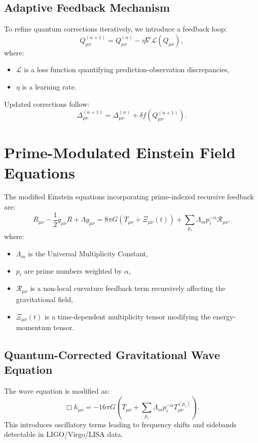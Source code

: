 \documentclass[12]{amsart}
\theoremstyle{plain}
\begin{document}
\subsection{Adaptive Feedback Mechanism}
To refine quantum corrections iteratively, we introduce a feedback loop:
\begin{equation}
    Q_{\mu\nu}^{(n+1)} = Q_{\mu\nu}^{(n)} - \eta \nabla \mathcal{L}(Q_{\mu\nu}),
\end{equation}
where:
\begin{itemize}
    \item \( \mathcal{L} \) is a loss function quantifying prediction-observation discrepancies,
    \item \( \eta \) is a learning rate.
\end{itemize}
Updated corrections follow:
\begin{equation}
    \Delta_{\mu\nu}^{(n+1)} = \Delta_{\mu\nu}^{(n)} + \delta f(Q_{\mu\nu}^{(n+1)}).
\end{equation}

\section{Prime-Modulated Einstein Field Equations}
The modified Einstein equations incorporating prime-indexed recursive feedback are:
\begin{equation}
    R_{\mu\nu} - \frac{1}{2} g_{\mu\nu} R + \Lambda g_{\mu\nu} = 8\pi G \left( T_{\mu\nu} + \Xi_{\mu\nu}(t) \right) + \sum_{p_i} \Lambda_m p_i^{-\alpha} \mathcal{R}_{\mu\nu}.
\end{equation}
where:
\begin{itemize}
    \item \( \Lambda_m \) is the Universal Multiplicity Constant,
    \item \( p_i \) are prime numbers weighted by \( \alpha \),
    \item \( \mathcal{R}_{\mu\nu} \) is a non-local curvature feedback term recursively affecting the gravitational field,
    \item \( \Xi_{\mu\nu}(t) \) is a time-dependent multiplicity tensor modifying the energy-momentum tensor.
\end{itemize}

\subsection{Quantum-Corrected Gravitational Wave Equation}
The wave equation is modified as:
\begin{equation}
    \Box h_{\mu\nu} = -16\pi G \left( T_{\mu\nu} + \sum_{p_i} \Lambda_m p_i^{-\alpha} T_{\mu\nu}^{(p_i)} \right).
\end{equation}
This introduces oscillatory terms leading to frequency shifts and sidebands detectable in LIGO/Virgo/LISA data.
\end{document}
